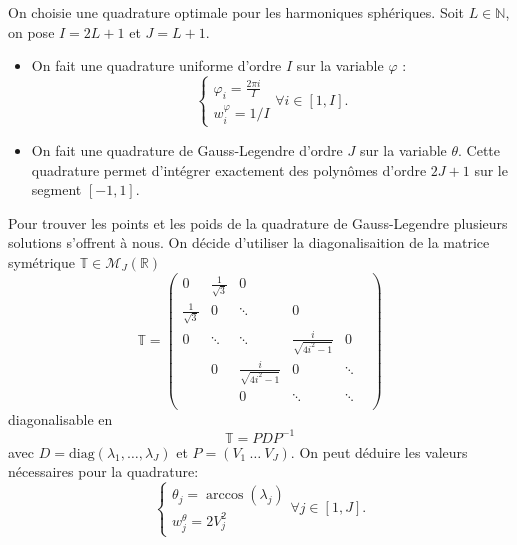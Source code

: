 \documentclass[11pt]{article}
\newcommand{\R}{\mathbb{R}}
\newcommand{\N}{\mathbb{N}}
\begin{document}
On choisie une quadrature optimale pour les harmoniques sphériques. Soit $L\in\N$, on pose $I = 2L+1$ et $J=L+1$.
\begin{itemize}
\item On fait une quadrature uniforme d'ordre $I$ sur la variable $\varphi$ :
  \[
    \begin{cases}
      \varphi_i = \frac{2 \pi i}{I} \\
      w^\varphi_i = 1/I
    \end{cases}
    \forall i \in [1, I].
  \]
\item On fait une quadrature de Gauss-Legendre d'ordre $J$ sur la variable $\theta$. Cette quadrature permet d'intégrer exactement des
  polynômes d'ordre $2J+1$ sur le segment $[-1,1]$.
\end{itemize}
Pour trouver les points et les poids de la quadrature de Gauss-Legendre plusieurs solutions s'offrent à nous. On décide d'utiliser la
diagonalisaition de la matrice symétrique $ \mathbb{T} \in \mathcal{M}_J(\R) $
\[
  \mathbb{T} = \left(
    \begin{matrix}
      0                  & \frac{1}{\sqrt{3}} & 0                       &                          &        &      \\
      \frac{1}{\sqrt{3}} & 0                  & \ddots                  & 0                        &        &      \\
      0                  & \ddots             & \ddots                  & \frac{i}{\sqrt{4i^2-1}}  & 0      &      \\
      ~                  & 0                  & \frac{i}{\sqrt{4i^2-1}} & 0                        & \ddots &      \\
      ~                  &                    & 0                       & \ddots                   & \ddots &      \\
      ~                  &                    &                         &                          &        &     
    \end{matrix}
  \right)
\]
diagonalisable en 
\[
  \mathbb{T} = P D P^{-1}
\]
avec $D = \text{diag}(\lambda_1, \dots, \lambda_J)$ et $P = (V_1~\dots~V_J)$. On peut déduire les valeurs nécessaires pour la quadrature:
\[
  \begin{cases}
    \theta_j = \arccos(\lambda_j) \\
    w^\theta_j = 2 V_j^2
  \end{cases}
  \forall j \in [1, J].
\]
\end{document}
